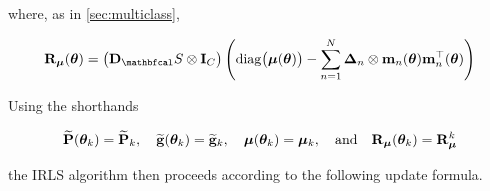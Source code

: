 where, as in \cref{sec:multiclass}, 

\begin{equation}
    \RR_{\muu}(\thetaa) =  \big(\D_\St \otimes \I_C\big) \left(\Diag{\muu(\thetaa)} - \sum_{n=1}^N \mathbf{\Delta}_{n} \otimes \m_n (\thetaa) \m_n^\top(\thetaa) \right)
\end{equation}

Using the shorthands

\begin{equation*}
    \widetilde{\mathbf{P}}(\boldsymbol{\theta}_k) = \widetilde{\mathbf{P}}_k, \quad \widetilde{\mathbf{g}}(\boldsymbol{\theta}_k) = \widetilde{\mathbf{g}}_k, \quad \boldsymbol{\mu}(\boldsymbol{\theta}_k) = \boldsymbol{\mu}_k, \quad \text{and} \quad \mathbf{R}_{\boldsymbol{\mu}}(\boldsymbol{\theta}_k) = \mathbf{R}_{\boldsymbol{\mu}}^k
\end{equation*}

the IRLS algorithm then proceeds according to the following update formula. 


\begingroup
\allowdisplaybreaks

